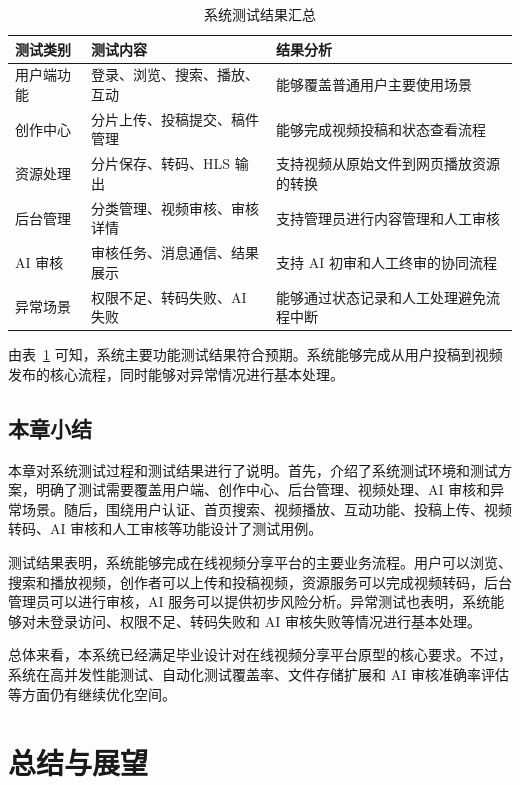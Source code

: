 \begin{table}[htbp]
  \centering
  \caption{系统测试结果汇总}
  \label{tab:test-result-summary}
  \begin{tabular}{p{}p{}p{}}
    \hline
    \textbf{测试类别} & \textbf{测试内容} & \textbf{结果分析} \\
    \hline
    用户端功能 & 登录、浏览、搜索、播放、互动 & 能够覆盖普通用户主要使用场景 \\
    创作中心 & 分片上传、投稿提交、稿件管理 & 能够完成视频投稿和状态查看流程 \\
    资源处理 & 分片保存、转码、HLS 输出 & 支持视频从原始文件到网页播放资源的转换 \\
    后台管理 & 分类管理、视频审核、审核详情 & 支持管理员进行内容管理和人工审核 \\
    AI 审核 & 审核任务、消息通信、结果展示 & 支持 AI 初审和人工终审的协同流程 \\
    异常场景 & 权限不足、转码失败、AI 失败 & 能够通过状态记录和人工处理避免流程中断 \\
    \hline
  \end{tabular}
\end{table}

由表~\ref{tab:test-result-summary} 可知，系统主要功能测试结果符合预期。系统能够完成从用户投稿到视频发布的核心流程，同时能够对异常情况进行基本处理。

\section{本章小结}
\label{sec:chapter6-summary}

本章对系统测试过程和测试结果进行了说明。首先，介绍了系统测试环境和测试方案，明确了测试需要覆盖用户端、创作中心、后台管理、视频处理、AI 审核和异常场景。随后，围绕用户认证、首页搜索、视频播放、互动功能、投稿上传、视频转码、AI 审核和人工审核等功能设计了测试用例。

测试结果表明，系统能够完成在线视频分享平台的主要业务流程。用户可以浏览、搜索和播放视频，创作者可以上传和投稿视频，资源服务可以完成视频转码，后台管理员可以进行审核，AI 服务可以提供初步风险分析。异常测试也表明，系统能够对未登录访问、权限不足、转码失败和 AI 审核失败等情况进行基本处理。

总体来看，本系统已经满足毕业设计对在线视频分享平台原型的核心要求。不过，系统在高并发性能测试、自动化测试覆盖率、文件存储扩展和 AI 审核准确率评估等方面仍有继续优化空间。

\chapter{总结与展望}
\label{chap:conclusion-outlook}

